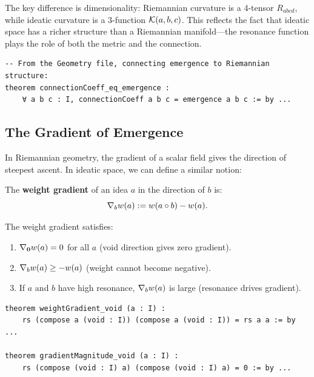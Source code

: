 The key difference is dimensionality: Riemannian curvature is a 4-tensor
$R_{abcd}$, while ideatic curvature is a 3-function $\mathcal{K}(a,b,c)$. This
reflects the fact that ideatic space has a richer structure than a Riemannian
manifold---the resonance function plays the role of both the metric and the
connection.

\begin{lstlisting}[caption={Connection coefficients (IDT\_v3\_Geometry.lean)}]
-- From the Geometry file, connecting emergence to Riemannian structure:
theorem connectionCoeff_eq_emergence :
    ∀ a b c : I, connectionCoeff a b c = emergence a b c := by ...
\end{lstlisting}

\subsection{The Gradient of Emergence}

In Riemannian geometry, the gradient of a scalar field gives the direction of
steepest ascent. In ideatic space, we can define a similar notion:

\begin{definition}
\label{def:weight-gradient}
The \textbf{weight gradient} of an idea $a$ in the direction of $b$ is:
\[
  \nabla_b w(a) := w(a \circ b) - w(a).
\]
\end{definition}

\begin{theorem}
\label{thm:weight-gradient}
The weight gradient satisfies:
\begin{enumerate}
  \item $\nabla_{\mathbf{0}} w(a) = 0$ for all $a$ (void direction gives zero gradient).
  \item $\nabla_b w(a) \geq -w(a)$ (weight cannot become negative).
  \item If $a$ and $b$ have high resonance, $\nabla_b w(a)$ is large (resonance drives gradient).
\end{enumerate}
\end{theorem}

\begin{lstlisting}[caption={Weight gradient (IDT\_v3\_Emergence.lean)}]
theorem weightGradient_void (a : I) :
    rs (compose a (void : I)) (compose a (void : I)) = rs a a := by ...

theorem gradientMagnitude_void (a : I) :
    rs (compose (void : I) a) (compose (void : I) a) = 0 := by ...
\end{lstlisting}


